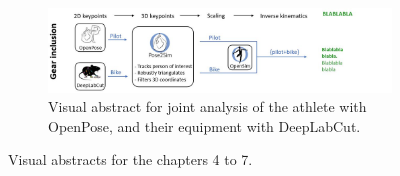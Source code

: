 \begin{figure}[hbtp]
\begin{subfigure}[b]{1\textwidth}
            \label{fig_visabstract4_1}
	\end{subfigure}
      \vskip 1cm
      \begin{subfigure}[b]{1\textwidth}
            \centering
            \def\svgwidth{1\columnwidth}
            \fontsize{10pt}{10pt}\selectfont
            \includegraphics[width=\linewidth]{"../Intro/Figures/Fig_VisAbstract5.JPG"}
            \caption{Visual abstract for joint analysis of the athlete with OpenPose, and their equipment with DeepLabCut.}
            \label{fig_visabstract5_1}
	\end{subfigure}
	\vskip 1cm
	\caption{Visual abstracts for the chapters 4 to 7.}
	\label{fig_visabstract}
\end{figure}


